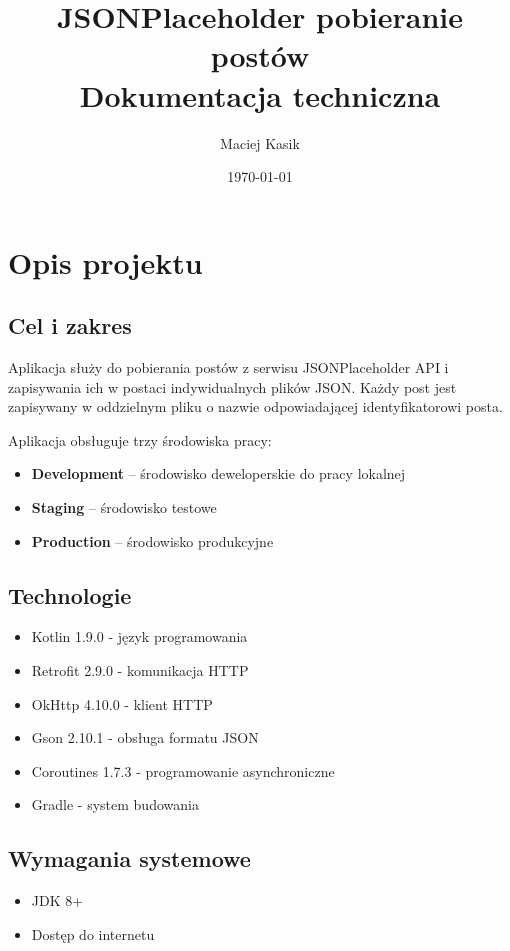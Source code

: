 \documentclass[12pt,a4paper]{article}
\title{\textbf{JSONPlaceholder pobieranie postów}\\
\large Dokumentacja techniczna}
\author{Maciej Kasik}
\date{\today}
\begin{document}
\maketitle
\tableofcontents
\newpage

\section{Opis projektu}

\subsection{Cel i zakres}
Aplikacja służy do pobierania postów z serwisu JSONPlaceholder API i zapisywania ich w postaci indywidualnych plików JSON. Każdy post jest zapisywany w oddzielnym pliku o nazwie odpowiadającej identyfikatorowi posta.

Aplikacja obsługuje trzy środowiska pracy:
\begin{itemize}
    \item \textbf{Development} -- środowisko deweloperskie do pracy lokalnej
    \item \textbf{Staging} -- środowisko testowe
    \item \textbf{Production} -- środowisko produkcyjne
\end{itemize}

\subsection{Technologie}
\begin{itemize}
    \item Kotlin 1.9.0 - język programowania
    \item Retrofit 2.9.0 - komunikacja HTTP
    \item OkHttp 4.10.0 - klient HTTP
    \item Gson 2.10.1 - obsługa formatu JSON
    \item Coroutines 1.7.3 - programowanie asynchroniczne
    \item Gradle - system budowania
\end{itemize}

\subsection{Wymagania systemowe}
\begin{itemize}
    \item JDK 8+
    \item Dostęp do internetu
\end{itemize}
\end{document}

